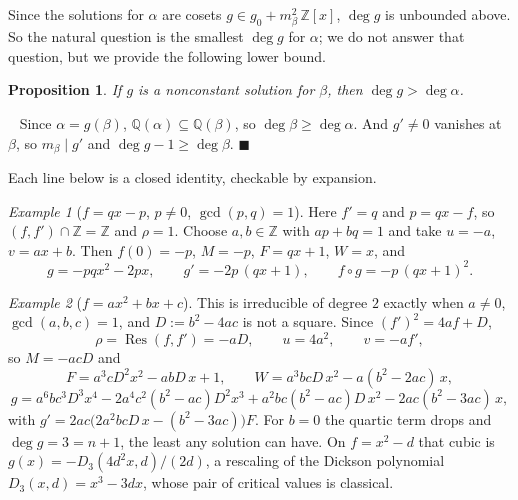 \documentclass[10pt]{article}
\newcommand\Z{\mathbb{Z}}
\newcommand\Q{\mathbb{Q}}
\theoremstyle{plain}
\newtheorem{prop}{Proposition}
\theoremstyle{remark}
\newtheorem{example}{Example}
\theoremstyle{plain}
\newenvironment{pf}{%
  \par\addvspace{\medskipamount}\noindent\uwave{pf.}\ \ignorespaces}{%
  \unskip\nobreak\hfill$\blacksquare$\par\addvspace{\medskipamount}}
\begin{document}
Since the solutions for $\alpha$ are cosets $g \in g_{0} + m_{\beta}^{2}\,\Z[x]$,
$\deg g$ is unbounded above. So the natural question is the smallest
$\deg g$ for $\alpha$; we do not answer that question, but we provide the
following lower bound.

\begin{prop}\label{Pdeg}
  If $g$ is a nonconstant solution for $\beta$, then $\deg g > \deg \alpha$.
\end{prop}

\begin{pf}
  Since $\alpha = g(\beta)$, $\Q(\alpha) \subseteq \Q(\beta)$, so
  $\deg \beta \geq \deg \alpha$. And $g' \neq 0$ vanishes at $\beta$, so
  $m_{\beta} \mid g'$ and $\deg g - 1 \geq \deg \beta$.
\end{pf}

Each line below is a closed identity, checkable by expansion.

\begin{example}[$f = qx - p$, $p \neq 0$, $\gcd(p,q) = 1$]
  Here $f' = q$ and $p = qx - f$, so $(f,f') \cap \Z = \Z$ and $\rho = 1$.
  Choose $a, b \in \Z$ with $ap + bq = 1$ and take $u = -a$, $v = ax + b$. Then
  $f(0) = -p$, $M = -p$, $F = qx + 1$, $W = x$, and
  \[
    g = -pqx^{2} - 2px, \qquad
    g' = -2p\,(qx+1), \qquad
    f \circ g = -p\,(qx+1)^{2}.
  \]
\end{example}

\begin{example}[$f = ax^{2} + bx + c$]\label{Exquad}
  This is irreducible of degree $2$ exactly when $a \neq 0$, $\gcd(a,b,c) = 1$,
  and $D := b^{2} - 4ac$ is not a square. Since $(f')^{2} = 4af + D$,
  \[
    \rho = \operatorname{Res}(f,f') = -aD, \qquad u = 4a^{2}, \qquad v = -af',
  \]
  so $M = -acD$ and
  \[
    F = a^{3}cD^{2}x^{2} - abD\,x + 1, \qquad
    W = a^{3}bcD\,x^{2} - a(b^{2}-2ac)\,x ,
  \]
  \[
    g = a^{6}bc^{3}D^{3}x^{4} - 2a^{4}c^{2}(b^{2}-ac)D^{2}x^{3}
        + a^{2}bc(b^{2}-ac)D\,x^{2} - 2ac(b^{2}-3ac)\,x ,
  \]
  with $g' = 2ac\bigl(2a^{2}bcD\,x - (b^{2}-3ac)\bigr)F$. For $b = 0$ the
  quartic term drops and $\deg g = 3 = n+1$, the least any solution can have.
  On $f = x^{2} - d$ that cubic is $g(x) = -D_{3}(4d^{2}x, d)/(2d)$, a rescaling
  of the Dickson polynomial $D_{3}(x,d) = x^{3} - 3dx$, whose pair of critical
  values is classical.

\end{example}
\end{document}
